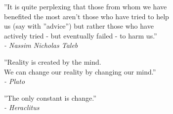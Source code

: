 \thispagestyle{plain}
\begin{flushright}
''It is quite perplexing that those from whom we have\\
benefited the most aren’t those who have tried to help\\
us (say with ''advice'') but rather those who have\\
actively tried - but eventually failed - to harm us.''\\

\textit{- Nassim Nicholas Taleb}
\end{flushright}
%
%

\begin{flushright}
''Reality is created by the mind.\\
We can change our reality by changing our mind.''\\

\textit{- Plato}
\end{flushright}
%
%

\begin{flushright}
''The only constant is change.''\\

\textit{- Heraclitus}
\end{flushright}